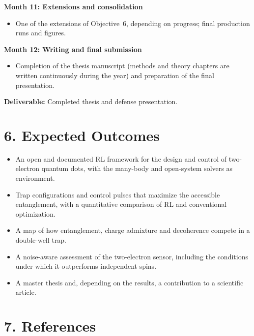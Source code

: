 \documentclass[12pt,a4paper]{article}
\begin{document}
\bigskip

\textbf{Month 11: Extensions and consolidation}
\begin{itemize}
    \item One of the extensions of Objective~6, depending on progress;
    final production runs and figures.
\end{itemize}

\bigskip

\textbf{Month 12: Writing and final submission}
\begin{itemize}
    \item Completion of the thesis manuscript (methods and theory
    chapters are written continuously during the year) and
    preparation of the final presentation.
\end{itemize}
\textbf{Deliverable:} Completed thesis and defense presentation.

\section*{6. Expected Outcomes}

\begin{itemize}
    \item An open and documented RL framework for the design and
    control of two-electron quantum dots, with the many-body and
    open-system solvers as environment.
    \item Trap configurations and control pulses that maximize the
    accessible entanglement, with a quantitative comparison of RL and
    conventional optimization.
    \item A map of how entanglement, charge admixture and decoherence
    compete in a double-well trap.
    \item A noise-aware assessment of the two-electron sensor,
    including the conditions under which it outperforms independent
    spins.
    \item A master thesis and, depending on the results, a
    contribution to a scientific article.
\end{itemize}

\section*{7. References}
\end{document}
